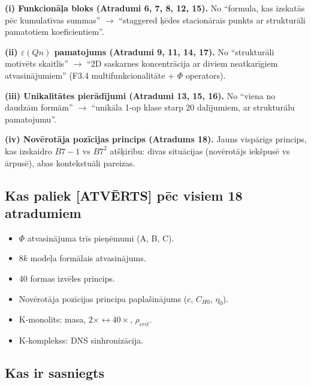 \documentclass[12pt,a4paper]{article}
\begin{document}
\textbf{(i) Funkcionāļa bloks (Atradumi 6, 7, 8, 12, 15).} No ``formula, kas izskatās pēc kumulatīvas summas'' $\to$ ``staggered ķēdes stacionārais punkts ar strukturāli pamatotiem koeficientiem''.

\textbf{(ii) $\varepsilon(Qn)$ pamatojums (Atradumi 9, 11, 14, 17).} No ``strukturāli motivēts skaitlis'' $\to$ ``2D saskarnes koncentrācija ar diviem neatkarīgiem atvasinājumiem'' (F3.4 multifunkcionalitāte + $\Phi$ operators).

\textbf{(iii) Unikalitātes pierādījumi (Atradumi 13, 15, 16).} No ``viena no daudzām formām'' $\to$ ``unikāla 1-op klase starp 20 dalījumiem, ar strukturālu pamatojumu''.

\textbf{(iv) Novērotāja pozīcijas princips (Atradums 18).} Jauns vispārīgs princips, kas izskaidro $B7-1$ vs $B7^2$ atšķirību: divas situācijas (novērotājs iekšpusē vs ārpusē), abas kontekstuāli pareizas.

\subsection*{Kas paliek [ATVĒRTS] pēc visiem 18 atradumiem}

\begin{itemize}
    \item $\Phi$ atvasinājuma trīs pieņēmumi (A, B, C).
    \item $8k$ modeļa formālais atvasinājums.
    \item 40 formas izvēles princips.
    \item Novērotāja pozīcijas principa paplašinājums ($c$, $C_{H0}$, $\eta_0$).
    \item K-monolīts: masa, $2\times\leftrightarrow 40\times$, $\rho_{crit}$.
    \item K-komplekss: DNS sinhronizācija.
\end{itemize}

\subsection*{Kas ir sasniegts}
\end{document}
